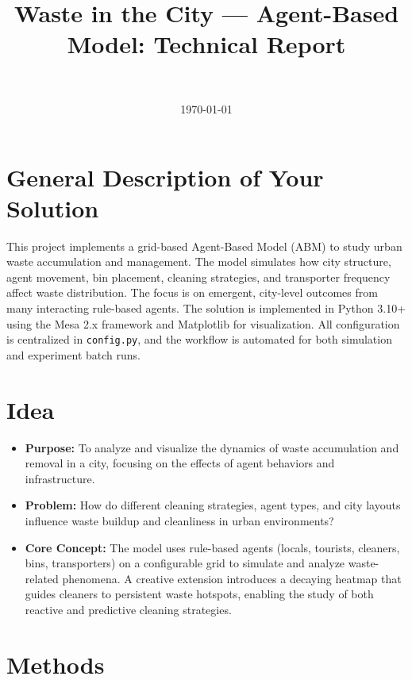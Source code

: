 \documentclass[12pt,a4paper]{article}
\title{Waste in the City --- Agent-Based Model: Technical Report}
\author{\ }
\date{\today}
\begin{document}
\maketitle

\section*{General Description of Your Solution}
This project implements a grid-based Agent-Based Model (ABM) to study urban waste accumulation and management. The model simulates how city structure, agent movement, bin placement, cleaning strategies, and transporter frequency affect waste distribution. The focus is on emergent, city-level outcomes from many interacting rule-based agents. The solution is implemented in Python 3.10+ using the Mesa 2.x framework and Matplotlib for visualization. All configuration is centralized in \texttt{config.py}, and the workflow is automated for both simulation and experiment batch runs.

\section*{Idea}
\begin{itemize}
    \item \textbf{Purpose:} To analyze and visualize the dynamics of waste accumulation and removal in a city, focusing on the effects of agent behaviors and infrastructure.
    \item \textbf{Problem:} How do different cleaning strategies, agent types, and city layouts influence waste buildup and cleanliness in urban environments?
    \item \textbf{Core Concept:} The model uses rule-based agents (locals, tourists, cleaners, bins, transporters) on a configurable grid to simulate and analyze waste-related phenomena. A creative extension introduces a decaying heatmap that guides cleaners to persistent waste hotspots, enabling the study of both reactive and predictive cleaning strategies.
\end{itemize}

\section*{Methods}
\end{document}
